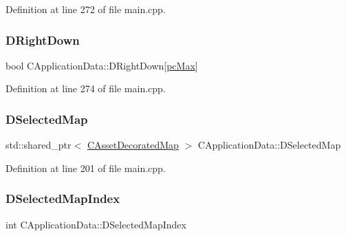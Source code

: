 Definition at line 272 of file main.\+cpp.

\hypertarget{classCApplicationData_a0eb2ef18b6e71e98517f8b813a658164}{}\label{classCApplicationData_a0eb2ef18b6e71e98517f8b813a658164} 
\subsubsection{\texorpdfstring{D\+Right\+Down}{DRightDown}}
{\footnotesize\ttfamily bool C\+Application\+Data\+::\+D\+Right\+Down\mbox{[}\hyperlink{GameDataTypes_8h_aafb0ca75933357ff28a6d7efbdd7602fa594a5c8dd3987f24e8a0f23f1a72cd34}{pc\+Max}\mbox{]}\hspace{0.3cm}{\ttfamily [protected]}}



Definition at line 274 of file main.\+cpp.

\hypertarget{classCApplicationData_abf74a18394e479b7090a8f9a55608867}{}\label{classCApplicationData_abf74a18394e479b7090a8f9a55608867} 
\subsubsection{\texorpdfstring{D\+Selected\+Map}{DSelectedMap}}
{\footnotesize\ttfamily std\+::shared\+\_\+ptr$<$ \hyperlink{classCAssetDecoratedMap}{C\+Asset\+Decorated\+Map} $>$ C\+Application\+Data\+::\+D\+Selected\+Map\hspace{0.3cm}{\ttfamily [protected]}}



Definition at line 201 of file main.\+cpp.

\hypertarget{classCApplicationData_a279cfd90004e3f1b90b119358ff25586}{}\label{classCApplicationData_a279cfd90004e3f1b90b119358ff25586} 
\subsubsection{\texorpdfstring{D\+Selected\+Map\+Index}{DSelectedMapIndex}}
{\footnotesize\ttfamily int C\+Application\+Data\+::\+D\+Selected\+Map\+Index\hspace{0.3cm}{\ttfamily [protected]}}



